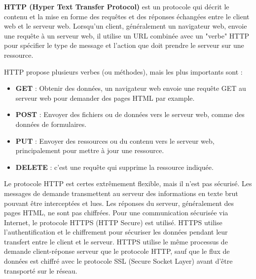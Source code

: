 \textbf{HTTP (Hyper Text Transfer Protocol)} est un protocole qui décrit le contenu et la mise en forme des requêtes et des réponses échangées entre le client web et le serveur web. 
Lorsqu'un client, généralement un navigateur web, envoie une requête à un serveur web, il utilise un URL combinée avec un "verbe" HTTP pour spécifier le type de message et l'action que doit prendre le serveur sur une ressource.

HTTP propose plusieurs verbes (ou méthodes), mais les plus importants sont : 
\begin{itemize}
	\item \textbf{GET} : Obtenir des données, un navigateur web envoie une requête GET au serveur web pour demander des pages HTML par example.
	\item \textbf{POST} : Envoyer des fichiers ou de données vers le serveur web, comme des données de formulaires.
	\item \textbf{PUT} : Envoyer des ressources ou du contenu vers le serveur web, principalement pour mettre à jour une ressource.
	\item \textbf{DELETE} : c'est une requête  qui supprime la ressource indiquée.
\end{itemize}
Le protocole HTTP est certes extrêmement flexible, mais il n'est pas sécurisé. Les messages de demande transmettent au serveur des informations en texte brut pouvant être interceptées et lues. Les réponses du serveur, généralement des pages HTML, ne sont pas chiffrées.
Pour une communication sécurisée via Internet, le protocole HTTPS (HTTP Secure) est utilisé. HTTPS utilise l'authentification et le chiffrement pour sécuriser les données pendant leur transfert entre le client et le serveur. HTTPS utilise le même processus de demande client-réponse serveur que le protocole HTTP, sauf que le flux de données est chiffré avec le protocole SSL (Secure Socket Layer) avant d'être transporté sur le réseau.

